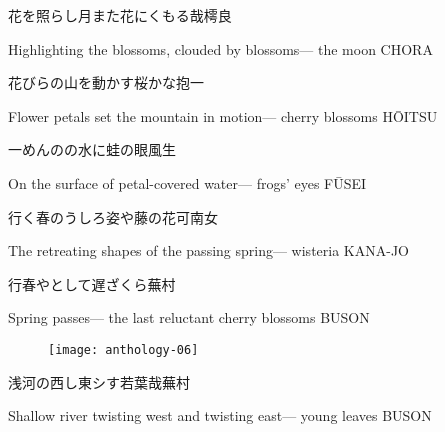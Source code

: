 \begin{haiku}
    {\FH 花を照らし月また花にくもる哉}\hfill{\FH 樗良}

    \vin{} Highlighting the blossoms,
    \vin{} \vin{} clouded by blossoms---
    \vin{} \vin{} \vin{} the moon \hspace{\fill} CHORA
\end{haiku}

\begin{haiku}
    {\FH 花びらの山を動かす桜かな}\hfill{\FH 抱一}

    \vin{} Flower petals
    \vin{} \vin{} set the mountain in motion---
    \vin{} \vin{} \vin{} cherry blossoms \hspace{\fill} H\={O}ITSU
\end{haiku}

\begin{haiku}
    {\FH 一めんのの水に蛙の眼}\hfill{\FH 風生}

    \vin{} On the surface
    \vin{} \vin{} of petal-covered water---
    \vin{} \vin{} \vin{} frogs' eyes \hspace{\fill} F\={U}SEI
\end{haiku}

\begin{haiku}
    {\FH 行く春のうしろ姿や藤の花}\hfill{\FH 可南女}

    \vin{} The retreating shapes
    \vin{} \vin{} of the passing spring---
    \vin{} \vin{} \vin{} wisteria \hspace{\fill} KANA-JO
\end{haiku}

\begin{haiku}
    {\FH 行春やとして遅ざくら}\hfill{\FH 蕪村}

    \vin{} Spring passes---
    \vin{} \vin{} the last reluctant
    \vin{} \vin{} \vin{} cherry blossoms \hspace{\fill} BUSON
\end{haiku}

\begin{figure}
    \texttt{[image: anthology-06]}
\end{figure}

\begin{haiku}
    {\FH 浅河の西し東シす若葉哉}\hfill{\FH 蕪村}

    \vin{} Shallow river
    \vin{} \vin{} twisting west and twisting east---
    \vin{} \vin{} \vin{} young leaves \hspace{\fill} BUSON
\end{haiku}

